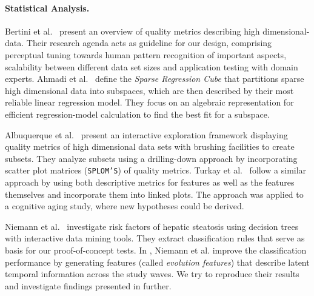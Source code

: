 \documentclass[journal]{style/vgtc} 			          %
\begin{document}
\paragraph{Statistical Analysis.}
Bertini et al.~\cite{Bertini} present an overview of quality metrics describing high dimensional-data.
Their research agenda acts as guideline for our design, comprising perceptual tuning towards human pattern recognition of important aspects, scalability between different data set sizes and application testing with domain experts.
Ahmadi et al.~\cite{Ahmadi} define the \emph{Sparse Regression Cube} that partitions sparse high dimensional data into subspaces, which are then described by their most reliable linear regression model.
They focus on an algebraic representation for efficient regression-model calculation to find the best fit for a subspace.

Albuquerque et al.~\cite{Albuquerque} present an interactive exploration framework displaying quality metrics of high dimensional data sets with brushing facilities to create subsets.
They analyze subsets using a drilling-down approach by incorporating scatter plot matrices (\texttt{SPLOM'S}) of quality metrics. %
Turkay et al.~\cite{Turkay} follow a similar approach by using both descriptive metrics for features as well as the features themselves and incorporate them into linked plots.
The approach was applied to a cognitive aging study, where new hypotheses could be derived.

Niemann et al.~\cite{Niemann2014} investigate risk factors of hepatic steatosis using decision trees with interactive data mining tools.
They extract classification rules that serve as basis for our proof-of-concept tests.
In \cite{Niemann2015}, Niemann et al. improve the classification performance by generating features (called \emph{evolution features}) that describe latent temporal information across the study waves.
We try to reproduce their results and investigate findings presented in \cite{Niemann2014} further.
\end{document}
